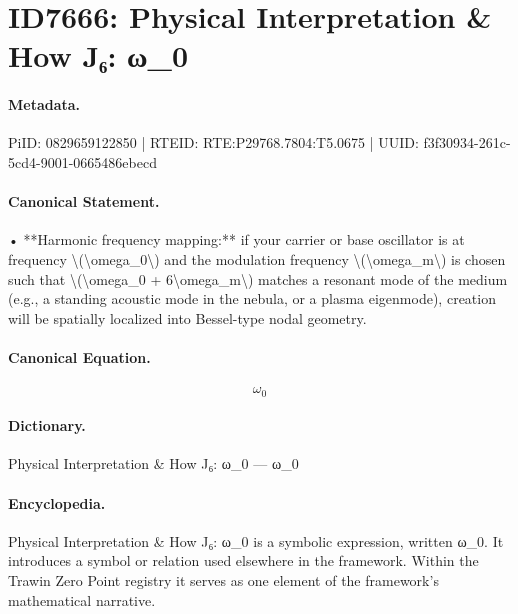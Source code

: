 \section*{ID7666: Physical Interpretation \& How J₆: ω\_0}
\paragraph{Metadata.}
PiID: 0829659122850 | RTEID: RTE:P29768.7804:T5.0675 | UUID: f3f30934-261c-5cd4-9001-0665486ebecd

\paragraph{Canonical Statement.}
• **Harmonic frequency mapping:** if your carrier or base oscillator is at frequency \textbackslash{}(\textbackslash{}omega\_0\textbackslash{}) and the modulation frequency \textbackslash{}(\textbackslash{}omega\_m\textbackslash{}) is chosen such that \textbackslash{}(\textbackslash{}omega\_0 + 6\textbackslash{}omega\_m\textbackslash{}) matches a resonant mode of the medium (e.g., a standing acoustic mode in the nebula, or a plasma eigenmode), creation will be spatially localized into Bessel-type nodal geometry.

\paragraph{Canonical Equation.}
\[
\omega_0
\]

\paragraph{Dictionary.}
Physical Interpretation \& How J₆: ω\_0 — ω\_0

\paragraph{Encyclopedia.}
Physical Interpretation \& How J₆: ω\_0 is a symbolic expression, written ω\_0. It introduces a symbol or relation used elsewhere in the framework. Within the Trawin Zero Point registry it serves as one element of the framework's mathematical narrative.
